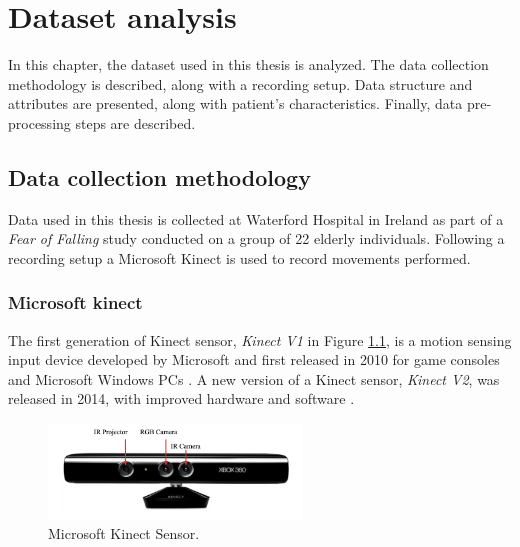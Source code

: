 \hypersetup{colorlinks=true, linkcolor=blue, citecolor=red}

\chapter{Dataset analysis} \label{chap:dataset_analysis}

    In this chapter, the dataset used in this thesis is analyzed. The data collection methodology is described, along with a recording setup. Data structure and attributes are presented, along with patient's characteristics. Finally, data pre-processing steps are described.

    \section{Data collection methodology}
        
        Data used in this thesis is collected at Waterford Hospital in Ireland as part of a \textit{Fear of Falling} study conducted on a group of 22 elderly individuals. Following a recording setup a Microsoft Kinect is used to record movements performed. 

        \subsection{Microsoft kinect}

            The first generation of Kinect sensor, \textit{Kinect V1} in Figure \ref{fig:kinect_sensor}, is a motion sensing input device developed by Microsoft and first released in 2010 for game consoles and Microsoft Windows PCs \cite{xu_validity_2015}. A new version of a Kinect sensor, \textit{Kinect V2}, was released in 2014, with improved hardware and software \cite{cruz_kinect_2012}. 

            \begin{figure}[H]
                \centering
                \includegraphics[width=0.6\textwidth]{./resources/images/kinect/kinect.png}
                \caption{Microsoft Kinect Sensor.}
                \label{fig:kinect_sensor}
            \end{figure}

